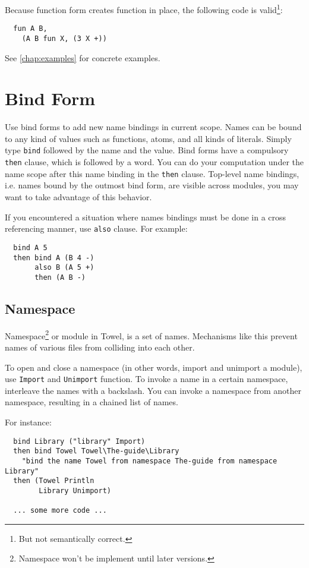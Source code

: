 \documentclass{book}
\begin{document}
Because function form creates function in place, the following code is valid\footnote{But not semantically correct.}:
\begin{verbatim}
  fun A B,
    (A B fun X, (3 X +))
\end{verbatim}

See \autoref{chap:examples} for concrete examples.

\section{Bind Form}

Use bind forms to add new name bindings in current scope. Names can be bound to any kind of values such as functions, atoms, and all kinds of literals. Simply type \texttt{bind} followed by the name and the value. Bind forms have a compulsory \texttt{then} clause, which is followed by a word. You can do your computation under the name scope after this name binding in the \texttt{then} clause. Top-level name bindings, i.e. names bound by the outmost bind form, are visible across modules, you may want to take advantage of this behavior.

If you encountered a situation where names bindings must be done in a cross referencing manner, use \texttt{also} clause. For example:
\begin{verbatim}
  bind A 5
  then bind A (B 4 -)
       also B (A 5 +)
       then (A B -)
\end{verbatim}

\subsection{Namespace}

Namespace\footnote{Namespace won't be implement until later versions.} or module in Towel, is a set of names. Mechanisms like this prevent names of various files from colliding into each other.

To open and close a namespace (in other words, import and unimport a module), use \texttt{Import} and \texttt{Unimport} function. To invoke a name in a certain namespace, interleave the names with a backslash. You can invoke a namespace from another namespace, resulting in a chained list of names.

For instance:
\begin{verbatim}
  bind Library ("library" Import)
  then bind Towel Towel\The-guide\Library
    "bind the name Towel from namespace The-guide from namespace Library"
  then (Towel Println
        Library Unimport)

  ... some more code ...
\end{verbatim}
\end{document}
